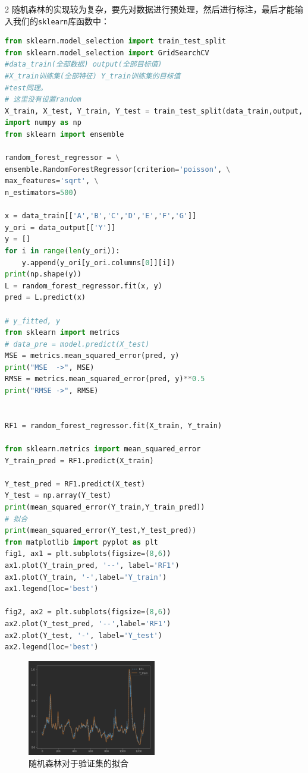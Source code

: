 \documentclass[11pt,a4paper]{elegantpaper}
\begin{document}
\begin{multicols}{2}
随机森林的实现较为复杂，要先对数据进行预处理，然后进行标注，最后才能输入我们的\lstinline{sklearn}库函数中：

\begin{lstlisting}[language=Python]
from sklearn.model_selection import train_test_split
from sklearn.model_selection import GridSearchCV
#data_train(全部数据) output(全部目标值)
#X_train训练集(全部特征) Y_train训练集的目标值
#test同理。
# 这里没有设置random
X_train, X_test, Y_train, Y_test = train_test_split(data_train,output, test_size=0.2,shuffle=False) #这里训练集75%:测试集25%
import numpy as np
from sklearn import ensemble

random_forest_regressor = \
ensemble.RandomForestRegressor(criterion='poisson', \
max_features='sqrt', \
n_estimators=500)

x = data_train[['A','B','C','D','E','F','G']]
y_ori = data_output[['Y']]
y = []
for i in range(len(y_ori)):
    y.append(y_ori[y_ori.columns[0]][i])
print(np.shape(y))
L = random_forest_regressor.fit(x, y)
pred = L.predict(x)

# y_fitted, y
from sklearn import metrics
# data_pre = model.predict(X_test)
MSE = metrics.mean_squared_error(pred, y)
print("MSE  ->", MSE)
RMSE = metrics.mean_squared_error(pred, y)**0.5
print("RMSE ->", RMSE)


RF1 = random_forest_regressor.fit(X_train, Y_train)

from sklearn.metrics import mean_squared_error
Y_train_pred = RF1.predict(X_train)

Y_test_pred = RF1.predict(X_test)
Y_test = np.array(Y_test)
print(mean_squared_error(Y_train,Y_train_pred))
# 拟合
print(mean_squared_error(Y_test,Y_test_pred))
from matplotlib import pyplot as plt
fig1, ax1 = plt.subplots(figsize=(8,6))
ax1.plot(Y_train_pred, '--', label='RF1')
ax1.plot(Y_train, '-',label='Y_train')
ax1.legend(loc='best')

fig2, ax2 = plt.subplots(figsize=(8,6))
ax2.plot(Y_test_pred, '--',label='RF1')
ax2.plot(Y_test, '-', label='Y_test')
ax2.legend(loc='best')
\end{lstlisting}

\begin{figure}[H]
  \centering
  \includegraphics[width=0.5\textwidth]{images/FFFF.png}
  \caption{随机森林对于验证集的拟合} 
\end{figure}


\end{multicols}
\end{document}
